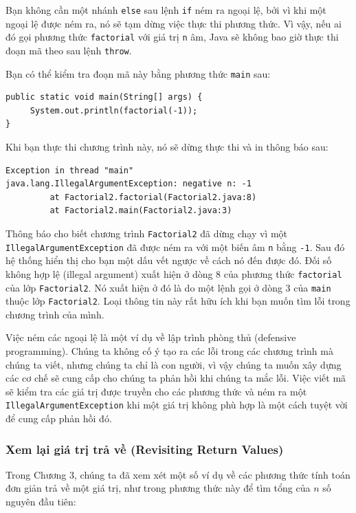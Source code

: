 Bạn không cần một nhánh \texttt{else} sau lệnh \texttt{if} ném ra ngoại
lệ, bởi vì khi một ngoại lệ được ném ra, nó sẽ tạm dừng việc thực thi
phương thức. Vì vậy, nếu ai đó gọi phương thức \texttt{factorial} với
giá trị \texttt{n} âm, Java sẽ không bao giờ thực thi đoạn mã theo sau
lệnh \texttt{throw}.

Bạn có thể kiểm tra đoạn mã này bằng phương thức \texttt{main} sau:

\begin{verbatim}
public static void main(String[] args) {
     System.out.println(factorial(-1));
}
\end{verbatim}

Khi bạn thực thi chương trình này, nó sẽ dừng thực thi và in thông báo
sau:

\begin{verbatim}
Exception in thread "main" 
java.lang.IllegalArgumentException: negative n: -1 
         at Factorial2.factorial(Factorial2.java:8) 
         at Factorial2.main(Factorial2.java:3)
\end{verbatim}

Thông báo cho biết chương trình \texttt{Factorial2} đã dừng chạy vì một
\texttt{IllegalArgumentException} đã được ném ra với một biến âm
\texttt{n} bằng \texttt{-1}. Sau đó hệ thống hiển thị cho bạn một dấu
vết ngược về cách nó đến được đó. Đối số không hợp lệ (illegal argument)
xuất hiện ở dòng 8 của phương thức \texttt{factorial} của lớp
\texttt{Factorial2}. Nó xuất hiện ở đó là do một lệnh gọi ở dòng 3 của
\texttt{main} thuộc lớp \texttt{Factorial2}. Loại thông tin này rất hữu
ích khi bạn muốn tìm lỗi trong chương trình của mình.

Việc ném các ngoại lệ là một ví dụ về lập trình phòng thủ (defensive
programming). Chúng ta không cố ý tạo ra các lỗi trong các chương trình
mà chúng ta viết, nhưng chúng ta chỉ là con người, vì vậy chúng ta muốn
xây dựng các cơ chế sẽ cung cấp cho chúng ta phản hồi khi chúng ta mắc
lỗi. Việc viết mã sẽ kiểm tra các giá trị được truyền cho các phương
thức và ném ra một \texttt{IllegalArgumentException} khi một giá trị
không phù hợp là một cách tuyệt vời để cung cấp phản hồi đó.

\subsubsection{Xem lại giá trị trả về (Revisiting Return
Values)}\label{xem-lux1ea1i-giuxe1-trux1ecb-trux1ea3-vux1ec1-revisiting-return-values}

Trong Chương 3, chúng ta đã xem xét một số ví dụ về các phương thức tính
toán đơn giản trả về một giá trị, như trong phương thức này để tìm tổng
của \(n\) số nguyên đầu tiên:

